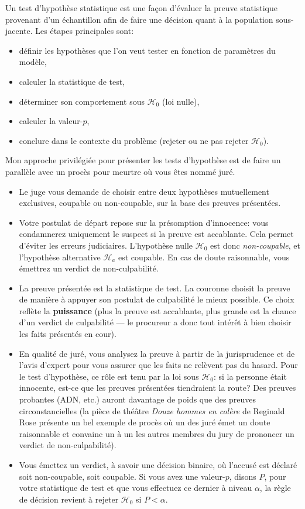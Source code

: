 \documentclass[
  11pt,
  letterpaper,
]{book}
\providecommand{\tightlist}{%
  \setlength{\itemsep}{0pt}\setlength{\parskip}{0pt}}
\begin{document}
Un test d'hypothèse statistique est une façon d'évaluer la preuve statistique provenant d'un échantillon afin de faire une décision quant à la population sous-jacente. Les étapes principales sont:

\begin{itemize}
\tightlist
\item
  définir les hypothèses que l'on veut tester en fonction de paramètres du modèle,
\item
  calculer la statistique de test,
\item
  déterminer son comportement sous \(\mathscr{H}_0\) (loi nulle),
\item
  calculer la valeur-\(p\),
\item
  conclure dans le contexte du problème (rejeter ou ne pas rejeter \(\mathscr{H}_0\)).
\end{itemize}

Mon approche privilégiée pour présenter les tests d'hypothèse est de faire un parallèle avec un procès pour meurtre où vous êtes nommé juré.

\begin{itemize}
\tightlist
\item
  Le juge vous demande de choisir entre deux hypothèses mutuellement exclusives, coupable ou non-coupable, sur la base des preuves présentées.
\item
  Votre postulat de départ repose sur la présomption d'innocence: vous condamnerez uniquement le suspect si la preuve est accablante. Cela permet d'éviter les erreurs judiciaires. L'hypothèse nulle \(\mathscr{H}_0\) est donc \emph{non-coupable}, et l'hypothèse alternative \(\mathscr{H}_a\) est coupable. En cas de doute raisonnable, vous émettrez un verdict de non-culpabilité.
\item
  La preuve présentée est la statistique de test. La couronne choisit la preuve de manière à appuyer son postulat de culpabilité le mieux possible. Ce choix reflète la \textbf{puissance} (plus la preuve est accablante, plus grande est la chance d'un verdict de culpabilité --- le procureur a donc tout intérêt à bien choisir les faits présentés en cour).
\item
  En qualité de juré, vous analysez la preuve à partir de la jurisprudence et de l'avis d'expert pour vous assurer que les faits ne relèvent pas du hasard. Pour le test d'hypothèse, ce rôle est tenu par la loi sous \(\mathscr{H}_0\): si la personne était innocente, est-ce que les preuves présentées tiendraient la route? Des preuves probantes (ADN, etc.) auront davantage de poids que des preuves circonstancielles (la pièce de théâtre \emph{Douze hommes en colère} de Reginald Rose présente un bel exemple de procès où un des juré émet un doute raisonnable et convainc un à un les autres membres du jury de prononcer un verdict de non-culpabilité).
\item
  Vous émettez un verdict, à savoir une décision binaire, où l'accusé est déclaré soit non-coupable, soit coupable. Si vous avez une valeur-\(p\), disons \(P\), pour votre statistique de test et que vous effectuez ce dernier à niveau \(\alpha\), la règle de décision revient à rejeter \(\mathscr{H}_0\) si \(P < \alpha\).
\end{itemize}
\end{document}
